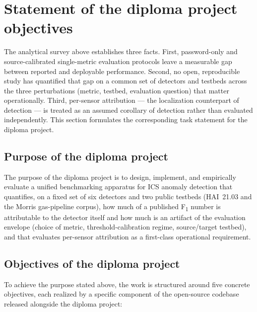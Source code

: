\section{Statement of the diploma project objectives}
\label{sec:task-statement}

The analytical survey above establishes three facts.  First, password-only and source-calibrated single-metric evaluation protocols leave a measurable gap between reported and deployable performance.  Second, no open, reproducible study has quantified that gap on a common set of detectors and testbeds across the three perturbations (metric, testbed, evaluation question) that matter operationally.  Third, per-sensor attribution --- the localization counterpart of detection --- is treated as an assumed corollary of detection rather than evaluated independently.  This section formulates the corresponding task statement for the diploma project.

\subsection{Purpose of the diploma project}
\label{sec:purpose}

The purpose of the diploma project is to design, implement, and empirically evaluate a unified benchmarking apparatus for ICS anomaly detection that quantifies, on a fixed set of six detectors and two public testbeds (HAI~21.03 and the Morris gas-pipeline corpus), how much of a published F\textsubscript{1} number is attributable to the detector itself and how much is an artifact of the evaluation envelope (choice of metric, threshold-calibration regime, source/target testbed), and that evaluates per-sensor attribution as a first-class operational requirement.

\subsection{Objectives of the diploma project}
\label{sec:objectives}

To achieve the purpose stated above, the work is structured around five concrete objectives, each realized by a specific component of the open-source codebase released alongside the diploma project:

